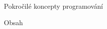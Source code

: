 \nopagenumbers

\tit Pokročilé koncepty programování
\newpage

\nonum\notoc\sec Obsah
\maketoc
\newpage

\pagenumbers



